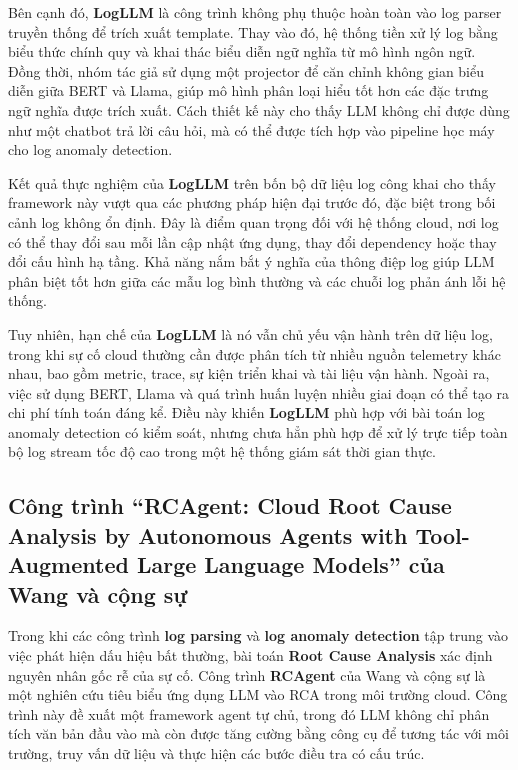 Bên cạnh đó, \textbf{LogLLM} là công trình không phụ thuộc hoàn toàn vào log parser truyền thống để trích xuất template. Thay vào đó, hệ thống tiền xử lý log bằng biểu thức chính quy và khai thác biểu diễn ngữ nghĩa từ mô hình ngôn ngữ. Đồng thời, nhóm tác giả sử dụng một projector để căn chỉnh không gian biểu diễn giữa BERT và Llama, giúp mô hình phân loại hiểu tốt hơn các đặc trưng ngữ nghĩa được trích xuất. Cách thiết kế này cho thấy LLM không chỉ được dùng như một chatbot trả lời câu hỏi, mà có thể được tích hợp vào pipeline học máy cho log anomaly detection.

Kết quả thực nghiệm của \textbf{LogLLM} trên bốn bộ dữ liệu log công khai cho thấy framework này vượt qua các phương pháp hiện đại trước đó, đặc biệt trong bối cảnh log không ổn định. Đây là điểm quan trọng đối với hệ thống cloud, nơi log có thể thay đổi sau mỗi lần cập nhật ứng dụng, thay đổi dependency hoặc thay đổi cấu hình hạ tầng. Khả năng nắm bắt ý nghĩa của thông điệp log giúp LLM phân biệt tốt hơn giữa các mẫu log bình thường và các chuỗi log phản ánh lỗi hệ thống.

Tuy nhiên, hạn chế của \textbf{LogLLM} là nó vẫn chủ yếu vận hành trên dữ liệu log, trong khi sự cố cloud thường cần được phân tích từ nhiều nguồn telemetry khác nhau, bao gồm metric, trace, sự kiện triển khai và tài liệu vận hành. Ngoài ra, việc sử dụng BERT, Llama và quá trình huấn luyện nhiều giai đoạn có thể tạo ra chi phí tính toán đáng kể. Điều này khiến \textbf{LogLLM} phù hợp với bài toán log anomaly detection có kiểm soát, nhưng chưa hẳn phù hợp để xử lý trực tiếp toàn bộ log stream tốc độ cao trong một hệ thống giám sát thời gian thực.

\subsection*{Công trình “RCAgent: Cloud Root Cause Analysis by Autonomous Agents with Tool-Augmented Large Language Models” của Wang và cộng sự}

Trong khi các công trình \textbf{log parsing} và \textbf{log anomaly detection} tập trung vào việc phát hiện dấu hiệu bất thường, bài toán \textbf{Root Cause Analysis} xác định nguyên nhân gốc rễ của sự cố. Công trình \textbf{RCAgent }của Wang và cộng sự là một nghiên cứu tiêu biểu ứng dụng LLM vào RCA trong môi trường cloud. Công trình này đề xuất một framework agent tự chủ, trong đó LLM không chỉ phân tích văn bản đầu vào mà còn được tăng cường bằng công cụ để tương tác với môi trường, truy vấn dữ liệu và thực hiện các bước điều tra có cấu trúc.

